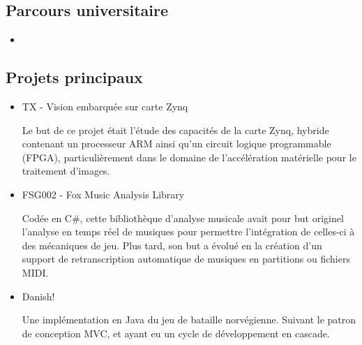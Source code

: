 \documentclass[11pt,a4paper,sans]{moderncv}        %
\begin{document}
\subsection{Parcours universitaire}

\vspace{5pt}

\begin{itemize}

\item{}

\end{itemize}

\vspace{2pt}

\subsection{Projets principaux}

\vspace{5pt}

\begin{itemize}

\item{TX - Vision embarquée sur carte Zynq}

\vspace{3pt}

\small{Le but de ce projet était l'étude des capacités de la carte Zynq, hybride contenant un processeur ARM ainsi qu'un circuit logique programmable (FPGA), particulièrement dans le domaine de l'accélération matérielle pour le traitement d'images.}

\vspace{6pt}

\item{FSG002 - Fox Music Analysis Library}

\vspace{3pt}

\small{Codée en C\#, cette bibliothèque d'analyse musicale avait pour but originel l'analyse en temps réel de musiques pour permettre l'intégration de celles-ci à des mécaniques de jeu. Plus tard, son but a évolué en la création d'un support de retranscription automatique de musiques en partitions ou fichiers MIDI.}

\vspace{6pt}

\item{Danish!}

\vspace{3pt}

\small{Une implémentation en Java du jeu de bataille norvégienne. Suivant le patron de conception MVC, et ayant eu un cycle de développement en cascade.}

\end{itemize}
\newpage
\end{document}
